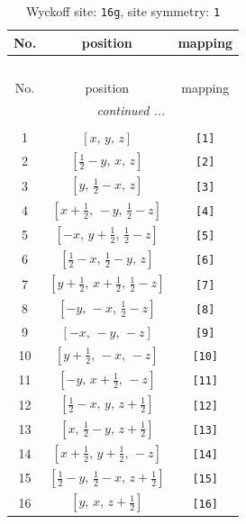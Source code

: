 \documentclass[fleqn,8pt]{jsarticle}
\begin{document}
\begin{longtable}{ccc}
\caption{Wyckoff site: {\tt 16g}, site symmetry: {\tt 1}}
 \\
 \hline \hline
No. & position & mapping \\ \hline \endfirsthead

\multicolumn{2}{l}{\tablename\ \thetable{}} \\
 \hline \hline
No. & position & mapping \\ \hline \endhead

 \hline \hline
\multicolumn{2}{r}{\footnotesize\it continued ...} \\ \endfoot

 \hline \hline
\multicolumn{2}{r}{} \\ \endlastfoot

1 & $\left[ x,\, y,\, z \right]$ & {\tt [1]} \\ \hline
2 & $\left[ \frac{1}{2} - y,\, x,\, z \right]$ & {\tt [2]} \\ \hline
3 & $\left[ y,\, \frac{1}{2} - x,\, z \right]$ & {\tt [3]} \\ \hline
4 & $\left[ x + \frac{1}{2},\, - y,\, \frac{1}{2} - z \right]$ & {\tt [4]} \\ \hline
5 & $\left[ - x,\, y + \frac{1}{2},\, \frac{1}{2} - z \right]$ & {\tt [5]} \\ \hline
6 & $\left[ \frac{1}{2} - x,\, \frac{1}{2} - y,\, z \right]$ & {\tt [6]} \\ \hline
7 & $\left[ y + \frac{1}{2},\, x + \frac{1}{2},\, \frac{1}{2} - z \right]$ & {\tt [7]} \\ \hline
8 & $\left[ - y,\, - x,\, \frac{1}{2} - z \right]$ & {\tt [8]} \\ \hline
9 & $\left[ - x,\, - y,\, - z \right]$ & {\tt [9]} \\ \hline
10 & $\left[ y + \frac{1}{2},\, - x,\, - z \right]$ & {\tt [10]} \\ \hline
11 & $\left[ - y,\, x + \frac{1}{2},\, - z \right]$ & {\tt [11]} \\ \hline
12 & $\left[ \frac{1}{2} - x,\, y,\, z + \frac{1}{2} \right]$ & {\tt [12]} \\ \hline
13 & $\left[ x,\, \frac{1}{2} - y,\, z + \frac{1}{2} \right]$ & {\tt [13]} \\ \hline
14 & $\left[ x + \frac{1}{2},\, y + \frac{1}{2},\, - z \right]$ & {\tt [14]} \\ \hline
15 & $\left[ \frac{1}{2} - y,\, \frac{1}{2} - x,\, z + \frac{1}{2} \right]$ & {\tt [15]} \\ \hline
16 & $\left[ y,\, x,\, z + \frac{1}{2} \right]$ & {\tt [16]} \\
\end{longtable}
\end{document}
